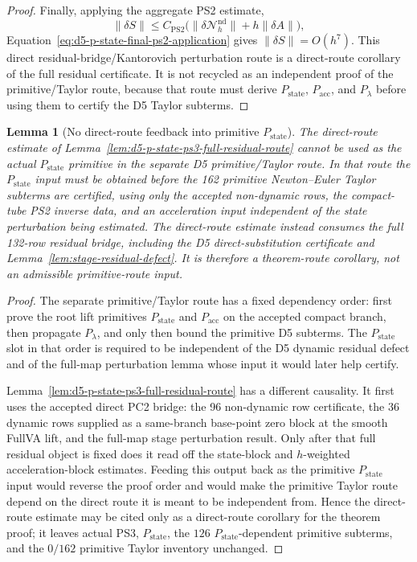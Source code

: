 \documentclass[preprint,12pt]{elsarticle}
\newtheorem{lemma}{Lemma}
\begin{document}
\begin{proof}
Finally, applying the aggregate PS2 estimate,
\begin{equation}
\label{eq:d5-p-state-final-ps2-application}
  \|\delta S\|\le C_{\mathrm{PS2}}
  \bigl(\|\delta\mathcal N_h^{\mathrm{nd}}\|+h\|\delta A\|\bigr),
\end{equation}
Equation~\eqref{eq:d5-p-state-final-ps2-application} gives
\(\|\delta S\|=O(h^7)\).  This direct
residual-bridge/Kantorovich perturbation route is a direct-route corollary of
the full residual certificate.  It is not recycled as an independent proof of
the primitive/Taylor route, because that route
must derive \(P_{\mathrm{state}}\), \(P_{\mathrm{acc}}\), and \(P_{\lambda}\)
before using them to certify the D5 Taylor subterms.
\end{proof}

\begin{lemma}[No direct-route feedback into primitive \(P_{\mathrm{state}}\)]
\label{lem:d5-p-state-direct-feedback-nonclosure}
The direct-route estimate of
Lemma~\ref{lem:d5-p-state-ps3-full-residual-route} cannot be used as the
actual \(P_{\mathrm{state}}\) primitive in the separate D5 primitive/Taylor
route.  In that route the \(P_{\mathrm{state}}\) input must be obtained before
the 162 primitive Newton--Euler Taylor subterms are certified, using only the
accepted non-dynamic rows, the compact-tube PS2 inverse data, and an
acceleration input independent of the state perturbation being estimated.
The direct-route estimate instead consumes the full 132-row residual bridge,
including the D5 direct-substitution certificate and
Lemma~\ref{lem:stage-residual-defect}.  It is therefore a theorem-route
corollary, not an admissible primitive-route input.
\end{lemma}

\begin{proof}
The separate primitive/Taylor route has a fixed dependency order:
first prove the root lift primitives \(P_{\mathrm{state}}\) and
\(P_{\mathrm{acc}}\) on the accepted compact branch, then propagate
\(P_{\lambda}\), and only then bound the primitive D5 subterms.  The
\(P_{\mathrm{state}}\) slot in that order is required to be independent of the
D5 dynamic residual defect and of the full-map perturbation lemma whose input
it would later help certify.

Lemma~\ref{lem:d5-p-state-ps3-full-residual-route} has a different
causality.  It first uses the accepted direct PC2 bridge: the 96 non-dynamic
row certificate, the 36 dynamic rows supplied as a same-branch base-point
zero block at the smooth FullVA lift, and the full-map stage perturbation
result.  Only after that full residual object is fixed does it read off the state-block and
\(h\)-weighted acceleration-block estimates.  Feeding this output back as the
primitive \(P_{\mathrm{state}}\) input would reverse the proof order and would
make the primitive Taylor route depend on the direct route it is meant to be
independent from.  Hence the direct-route estimate may be cited only as a
direct-route corollary for the theorem proof; it leaves actual PS3,
\(P_{\mathrm{state}}\), the \(126\) \(P_{\mathrm{state}}\)-dependent
primitive subterms, and the \(0/162\) primitive Taylor inventory unchanged.
\end{proof}
\end{document}
